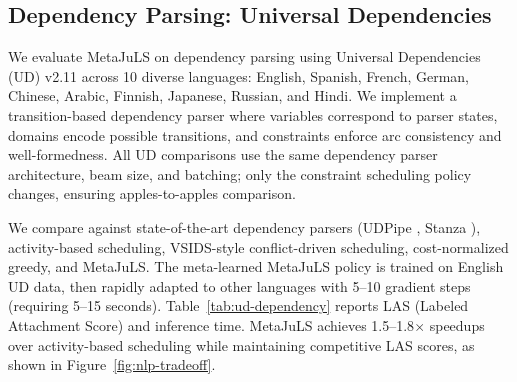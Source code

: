\documentclass[11pt]{article}
\begin{document}
\begin{table}[t]
  \centering
  \small
  \caption{PTB constituency parsing results (Section 23). Same parser, different scheduling. Mean $\pm$ std (5 runs). MetaJuLS is significantly better than all baselines ($p < 0.01$).}
  \label{tab:ptb-constituency}
\end{table}




\subsection{Dependency Parsing: Universal Dependencies}

We evaluate MetaJuLS on dependency parsing using Universal Dependencies (UD) v2.11 \citep{zeman2022universal} across 10 diverse languages: English, Spanish, French, German, Chinese, Arabic, Finnish, Japanese, Russian, and Hindi. We implement a transition-based dependency parser where variables correspond to parser states, domains encode possible transitions, and constraints enforce arc consistency and well-formedness. All UD comparisons use the same dependency parser architecture, beam size, and batching; only the constraint scheduling policy changes, ensuring apples-to-apples comparison.

We compare against state-of-the-art dependency parsers (UDPipe \citep{straka2016udpipe}, Stanza \citep{qi2020stanza}), activity-based scheduling, VSIDS-style conflict-driven scheduling, cost-normalized greedy, and MetaJuLS. The meta-learned MetaJuLS policy is trained on English UD data, then rapidly adapted to other languages with 5--10 gradient steps (requiring 5--15 seconds). Table~\ref{tab:ud-dependency} reports LAS (Labeled Attachment Score) and inference time. MetaJuLS achieves 1.5--1.8$\times$ speedups over activity-based scheduling while maintaining competitive LAS scores, as shown in Figure~\ref{fig:nlp-tradeoff}.
\end{document}
